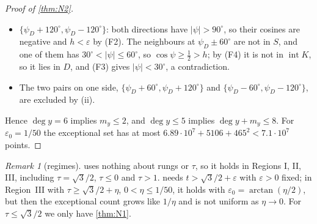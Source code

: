 \documentclass[11pt]{amsart}
\theoremstyle{definition}
\theoremstyle{remark}
\newtheorem{remark}[theorem]{Remark}
\newcommand{\eps}{\varepsilon}
\begin{document}
\begin{proof}[Proof of \cref{thm:N2}]
\begin{enumerate}[label=(\roman*),leftmargin=2em,resume]
\begin{itemize}[leftmargin=1.5em]
\item $\{\psi_D+120^\circ,\psi_D-120^\circ\}$: both directions have $|\psi|>90^\circ$, so their cosines are negative and $h<\eps$ by (F2). The neighbours at $\psi_D\pm60^\circ$ are not in $S$, and one of them has $30^\circ<|\psi|\le60^\circ$, so $\cos\psi\ge\frac12>h$; by (F4) it is not in $\operatorname{int}K$, so it lies in $D$, and (F3) gives $|\psi|<30^\circ$, a contradiction.
\item The two pairs on one side, $\{\psi_D+60^\circ,\psi_D+120^\circ\}$ and $\{\psi_D-60^\circ,\psi_D-120^\circ\}$, are excluded by (ii).
\end{itemize}
\end{enumerate}
Hence $\deg y=6$ implies $m_y\le2$, and $\deg y\le5$ implies $\deg y+m_y\le8$. For $\eps_0=1/50$ the exceptional set has at most $6.89\cdot10^7+5106+465^2<7.1\cdot10^7$ points.
\end{proof}

\begin{remark}[regimes]
 uses nothing about rungs or $\tau$, so it holds in Regions I, II, III, including $\tau=\sqrt3/2$, $\tau\le0$ and $\tau>1$.  needs $t>\sqrt3/2+\eps$ with $\eps>0$ fixed; in Region~III with $\tau\ge\sqrt3/2+\eta$, $0<\eta\le1/50$, it holds with $\eps_0=\arctan(\eta/2)$, but then the exceptional count grows like $1/\eta$ and is not uniform as $\eta\to0$. For $\tau\le\sqrt3/2$ we only have \cref{thm:N1}.
\end{remark}
\end{document}
